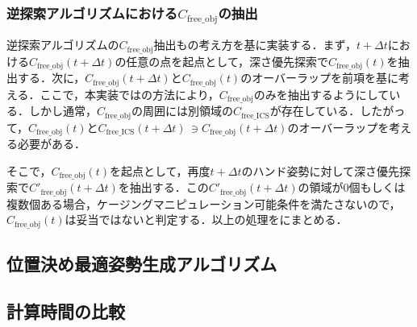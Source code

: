 \documentclass[a4paper,twoside,12pt,papersize, dvipdfmx]{iirthesis}
\begin{document}
{%

\subsubsection{逆探索アルゴリズムにおける$C_{\mathrm{free\_obj}}$の抽出}
逆探索アルゴリズムの$C_{\mathrm{free\_obj}}$抽出もの考え方を基に実装する．まず，$t+\Delta t$における$C_{\mathrm{free\_obj}}(t+\Delta t)$の任意の点を起点として，深さ優先探索で$C_{\mathrm{free\_obj}}(t)$を抽出する．次に，$C_{\mathrm{free\_obj}}(t+\Delta t)$と$C_{\mathrm{free\_obj}}(t)$のオーバーラップを前項を基に考える．ここで，本実装ではの方法により，$C_{\mathrm{free\_obj}}$のみを抽出するようにしている．しかし通常，$C_{\mathrm{free\_obj}}$の周囲には別領域の$C_{\mathrm{free\_ICS}}$が存在している．したがって，$C_{\mathrm{free\_obj}}(t)$と$C_{\mathrm{free\_ICS}}(t+\Delta t)\, \ni C_{\mathrm{free\_obj}}(t+\Delta t)$のオーバーラップを考える必要がある．\par
そこで，$C_{\mathrm{free\_obj}}(t)$を起点として，再度$t+\Delta t$のハンド姿勢に対して深さ優先探索で$C'_{\mathrm{free\_obj}}(t+\Delta t)$を抽出する．この$C'_{\mathrm{free\_obj}}(t+\Delta t)$の領域が0個もしくは複数個ある場合，ケージングマニピュレーション可能条件を満たさないので，$C_{\mathrm{free\_obj}}(t)$は妥当ではないと判定する．以上の処理をにまとめる．


\subsection{位置決め最適姿勢生成アルゴリズム}
\subsection{計算時間の比較}


}
\end{document}
